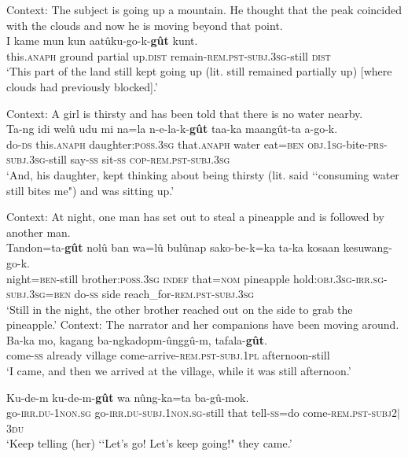 \begin{exe}
	\ex \label{exAppendixMaManda1}
Context: The subject is going up a mountain. He thought that the peak coincided with the clouds and now he is moving beyond that point.\\
	\gll I kame mun kun aatûku-go-k-\textbf{gût} kunt.\\
this.\textsc{anaph} ground partial up.\textsc{dist} remain-\textsc{rem.pst}-\textsc{subj}.3\textsc{sg}-still \textsc{dist}\\
	\glt \lq This part of the land still kept going up (lit. still remained partially up) [where clouds had previously blocked].'
\parencite[578]{Pennington2016}

	\ex Context: A girl is thirsty and has been told that there is no water nearby. \label{exAppendixMaManda2}\\
	\gll Ta-ng idi welû udu mi na=la n-e-la-k-\textbf{gût} taa-ka maangût-ta a-go-k.\\
do-\textsc{ds} this.\textsc{anaph} daughter:\textsc{poss}.3\textsc{sg} that.\textsc{anaph} water eat=\textsc{ben} \textsc{obj}.\textsc{1sg}-bite-\textsc{prs}-\textsc{subj}.3\textsc{sg}-still say-\textsc{ss} sit-\textsc{ss} \textsc{cop}-\textsc{rem.pst}-\textsc{subj}.3\textsc{sg}\\
	\glt \lq And, his daughter, kept thinking about being thirsty (lit. said \lq\lq consuming water still bites me") and was sitting up.\rq{ }\parencite[596]{Pennington2016}

	\ex\label{exAppendixMaManda3}
	Context: At night, one man has set out to steal a pineapple and is followed by another man.\\
	\gll Tandon=ta-\textbf{gût} nolû ban wa=lû bulûnap sako-be-k=ka ta-ka kosaan kesuwang-go-k.\\
	night=\textsc{ben}-still brother:\textsc{poss}.3\textsc{sg} \textsc{indef} that=\textsc{nom} pineapple hold:\textsc{obj.}3\textsc{sg}-\textsc{irr.sg}-\textsc{subj}.3\textsc{sg}=\textsc{ben} do-\textsc{ss} side reach\_for-\textsc{rem.pst}-\textsc{subj}.3\textsc{sg}\\
	\glt \lq Still in the night, the other brother reached out on the side to grab the pineapple.' \parencite[566]{Pennington2016} 
	\pagebreak
	\ex\label{exAppendixMaManda4}
	Context: The narrator and her companions have been moving around.\\
	\gll Ba-ka mo, kagang ba-ngkadopm-ûnggû-m, tafala-\textbf{gût}.\\
	come-\textsc{ss} already village come-arrive-\textsc{rem}.\textsc{pst}-\textsc{subj}.1\textsc{pl} afternoon-still\\
	\glt \lq I came, and then we arrived at the village, while it was still afternoon.’ \parencite[549]{Pennington2016}
	
	\ex\label{exAppendixMaManda5}
	\gll Ku-de-m ku-de-m-\textbf{gût} wa nûng-ka=ta ba-gû-mok.\\
go-\textsc{irr.du}-1\textsc{non.sg} go-\textsc{irr.du}-\textsc{subj}.1\textsc{non.sg}-still that tell-\textsc{ss}=do come-\textsc{rem.pst}-\textsc{subj}2$|$3\textsc{du}\\
	\glt \lq Keep telling (her) \lq\lq Let’s go! Let’s keep going!" they came.\rq{ }\parencite[166]{Pennington2016}
\end{exe}


